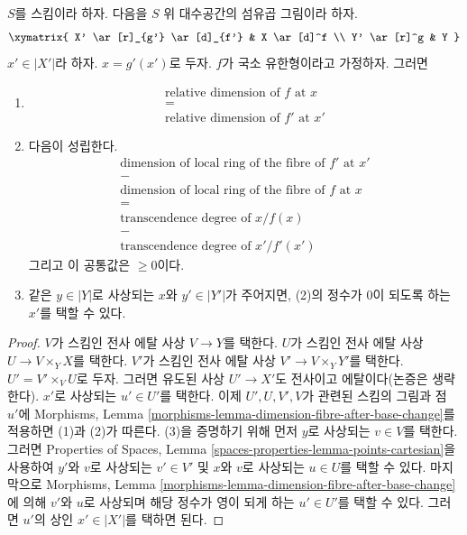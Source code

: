 \begin{lemma}
\label{lemma-dimension-fibre-after-base-change}
$S$를 스킴이라 하자. 다음을 $S$ 위 대수공간의 섬유곱 그림이라 하자.
$$
\xymatrix{
X' \ar[r]_{g'} \ar[d]_{f'} & X \ar[d]^f \\
Y' \ar[r]^g & Y
}
$$
$x' \in |X'|$라 하자. $x = g'(x')$로 두자.
$f$가 국소 유한형이라고 가정하자. 그러면
\begin{enumerate}
\item
$$
\begin{matrix}
\text{relative dimension of }f\text{ at }x \\
= \\
\text{relative dimension of }f'\text{ at }x'
\end{matrix}
$$
\item 다음이 성립한다.
$$
\begin{matrix}
\text{dimension of local ring of the fibre of }f'\text{ at }x' \\
- \\
\text{dimension of local ring of the fibre of }f\text{ at }x \\
= \\
\text{transcendence degree of }x/f(x) \\
- \\
\text{transcendence degree of }x'/f'(x')
\end{matrix}
$$
그리고 이 공통값은 $\geq 0$이다.
\item 같은 $y \in |Y|$로 사상되는 $x$와 $y' \in |Y'|$가
주어지면, (2)의 정수가 $0$이 되도록 하는 $x'$를 택할 수 있다.
\end{enumerate}
\end{lemma}

\begin{proof}
$V$가 스킴인 전사 에탈 사상 $V \to Y$를 택한다.
$U$가 스킴인 전사 에탈 사상 $U \to V \times_Y X$를 택한다.
$V'$가 스킴인 전사 에탈 사상 $V' \to V \times_Y Y'$를 택한다.
$U' = V' \times_V U$로 두자. 그러면 유도된 사상 $U' \to X'$도
전사이고 에탈이다(논증은 생략한다). $x'$로 사상되는
$u' \in U'$를 택한다. 이제 $U', U, V', V$가 관련된 스킴의
그림과 점 $u'$에 Morphisms, Lemma
\ref{morphisms-lemma-dimension-fibre-after-base-change}를 적용하면
(1)과 (2)가 따른다. (3)을 증명하기 위해 먼저 $y$로 사상되는
$v \in V$를 택한다. 그러면 Properties of Spaces, Lemma
\ref{spaces-properties-lemma-points-cartesian}을 사용하여
$y'$와 $v$로 사상되는 $v' \in V'$ 및 $x$와 $v$로 사상되는
$u \in U$를 택할 수 있다. 마지막으로 Morphisms, Lemma
\ref{morphisms-lemma-dimension-fibre-after-base-change}에 의해
$v'$와 $u$로 사상되며 해당 정수가 영이 되게 하는
$u' \in U'$를 택할 수 있다. 그러면 $u'$의 상인 $x' \in |X'|$를
택하면 된다.
\end{proof}


